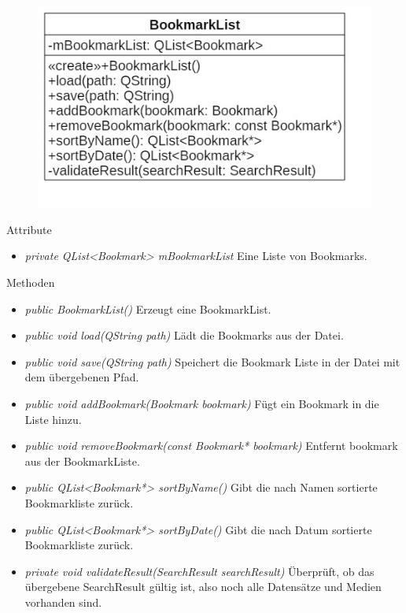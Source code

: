 \begin{figure}[H]
\centering
\includegraphics[scale=0.5]{img/Klassendiagramm/Klassen/BookmarkList}
\label{fig:bookmarkList}
\end{figure}

Attribute
\begin{itemize}
\item\textit{private QList<Bookmark> mBookmarkList} Eine Liste von Bookmarks.
\end{itemize}

Methoden
\begin{itemize}
\item \textit{public BookmarkList()} Erzeugt eine BookmarkList.
\item \textit{public void load(QString path)} Lädt die Bookmarks aus der Datei.
\item \textit{public void save(QString path)} Speichert die Bookmark Liste in der Datei mit dem übergebenen Pfad.
\item \textit{public void addBookmark(Bookmark bookmark)} Fügt ein Bookmark in die Liste hinzu.
\item \textit{public void removeBookmark(const Bookmark* bookmark)} Entfernt bookmark aus der BookmarkListe.
\item \textit{public QList<Bookmark*> sortByName()} Gibt die nach Namen sortierte Bookmarkliste zurück.
\item \textit{public QList<Bookmark*> sortByDate()} Gibt die nach Datum sortierte Bookmarkliste zurück.
\item \textit{private void validateResult(SearchResult searchResult)} Überprüft, ob das übergebene SearchResult gültig ist, also noch alle Datensätze und Medien vorhanden sind.
\end{itemize}

